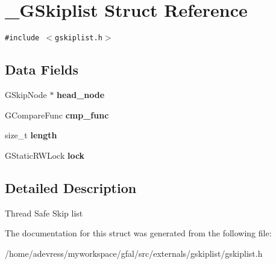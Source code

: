 \section{\_\-GSkiplist Struct Reference}
\label{struct__GSkiplist}
{\tt \#include $<$gskiplist.h$>$}

\subsection*{Data Fields}
\begin{CompactItemize}
\item 
GSkip\-Node $\ast$ \textbf{head\_\-node}\label{struct__GSkiplist_ceee4c66cbdc3177900b2330779c21e9}

\item 
GCompare\-Func \textbf{cmp\_\-func}\label{struct__GSkiplist_72b4f5cdaabb8df62ab5c0b7f6935a57}

\item 
size\_\-t \textbf{length}\label{struct__GSkiplist_bb6a38faf9d0dd2c523a35e9601aed62}

\item 
GStatic\-RWLock \textbf{lock}\label{struct__GSkiplist_818a67fc72769d933b2f1ced0c1f94a4}

\end{CompactItemize}


\subsection{Detailed Description}
Thread Safe Skip list 



The documentation for this struct was generated from the following file:\begin{CompactItemize}
\item 
/home/adevress/myworkspace/gfal/src/externals/gskiplist/gskiplist.h\end{CompactItemize}
